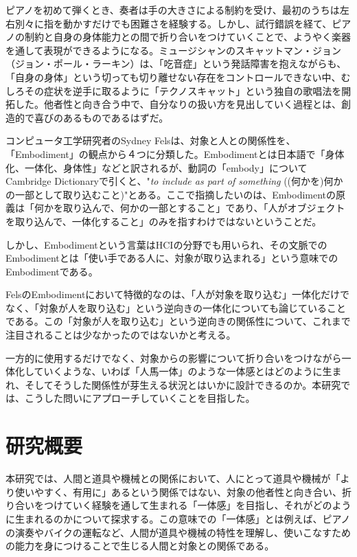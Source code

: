 ピアノを初めて弾くとき、奏者は手の大きさによる制約を受け、最初のうちは左右別々に指を動かすだけでも困難さを経験する。しかし、試行錯誤を経て、ピアノの制約と自身の身体能力との間で折り合いをつけていくことで、ようやく楽器を通して表現ができるようになる。ミュージシャンのスキャットマン・ジョン（ジョン・ポール・ラーキン）は、「吃音症」という発話障害を抱えながらも、「自身の身体」という切っても切り離せない存在をコントロールできない中、むしろその症状を逆手に取るように「テクノスキャット」という独自の歌唱法を開拓した。他者性と向き合う中で、自分なりの扱い方を見出していく過程とは、創造的で喜びのあるものであるはずだ。

コンピュータ工学研究者のSydney Felsは、対象と人との関係性を、「Embodiment」の観点から４つに分類した\cite{Fels}。Embodimentとは日本語で「身体化、一体化、身体性」などと訳されるが、動詞の「embody」についてCambridge Dictionaryで引くと、"\textit{to include as part of something} ((何かを)何かの一部として取り込むこと)"とある\cite{embody}。ここで指摘したいのは、Embodimentの原義は「何かを取り込んで、何かの一部とすること」であり、「人がオブジェクトを取り込んで、一体化すること」のみを指すわけではないということだ。

しかし、Embodimentという言葉はHCIの分野でも用いられ、その文脈でのEmbodimentとは「使い手である人に、対象が取り込まれる」という意味でのEmbodimentである\cite{veq}。

FelsのEmbodimentにおいて特徴的なのは、「人が対象を取り込む」一体化だけでなく、「対象が人を取り込む」という逆向きの一体化についても論じていることである。この「対象が人を取り込む」という逆向きの関係性について、これまで注目されることは少なかったのではないかと考える。

一方的に使用するだけでなく、対象からの影響について折り合いをつけながら一体化していくような、いわば「人馬一体」のような一体感とはどのように生まれ、そしてそうした関係性が芽生える状況とはいかに設計できるのか。本研究では、こうした問いにアプローチしていくことを目指した。

\section{研究概要}
本研究では、人間と道具や機械との関係において、人にとって道具や機械が「より使いやすく、有用に」あるという関係ではない、対象の他者性と向き合い、折り合いをつけていく経験を通して生まれる「一体感」を目指し、それがどのように生まれるのかについて探求する。この意味での「一体感」とは例えば、ピアノの演奏やバイクの運転など、人間が道具や機械の特性を理解し、使いこなすための能力を身につけることで生じる人間と対象との関係である。


